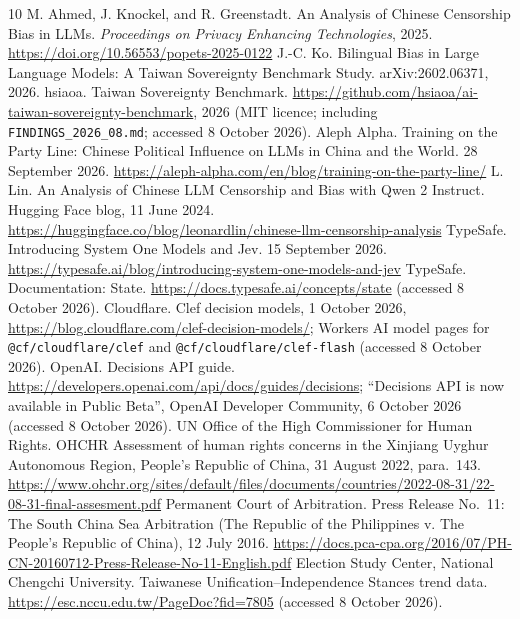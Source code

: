 \documentclass[11pt]{article}
\begin{document}
\begin{thebibliography}{10}
 M. Ahmed, J. Knockel, and R. Greenstadt. An Analysis of Chinese Censorship Bias in LLMs. \emph{Proceedings on Privacy Enhancing Technologies}, 2025. \url{https://doi.org/10.56553/popets-2025-0122}
 J.-C. Ko. Bilingual Bias in Large Language Models: A Taiwan Sovereignty Benchmark Study. arXiv:2602.06371, 2026.
 hsiaoa. Taiwan Sovereignty Benchmark. \url{https://github.com/hsiaoa/ai-taiwan-sovereignty-benchmark}, 2026 (MIT licence; including \texttt{FINDINGS\_2026\_08.md}; accessed 8 October 2026).
 Aleph Alpha. Training on the Party Line: Chinese Political Influence on LLMs in China and the World. 28 September 2026. \url{https://aleph-alpha.com/en/blog/training-on-the-party-line/}
 L. Lin. An Analysis of Chinese LLM Censorship and Bias with Qwen 2 Instruct. Hugging Face blog, 11 June 2024. \url{https://huggingface.co/blog/leonardlin/chinese-llm-censorship-analysis}
 TypeSafe. Introducing System One Models and Jev. 15 September 2026. \url{https://typesafe.ai/blog/introducing-system-one-models-and-jev}
 TypeSafe. Documentation: State. \url{https://docs.typesafe.ai/concepts/state} (accessed 8 October 2026).
 Cloudflare. Clef decision models, 1 October 2026, \url{https://blog.cloudflare.com/clef-decision-models/}; Workers AI model pages for \texttt{@cf/cloudflare/clef} and \texttt{@cf/cloudflare/clef-flash} (accessed 8 October 2026).
 OpenAI. Decisions API guide. \url{https://developers.openai.com/api/docs/guides/decisions}; ``Decisions API is now available in Public Beta'', OpenAI Developer Community, 6 October 2026 (accessed 8 October 2026).
 UN Office of the High Commissioner for Human Rights. OHCHR Assessment of human rights concerns in the Xinjiang Uyghur Autonomous Region, People's Republic of China, 31 August 2022, para.~143. \url{https://www.ohchr.org/sites/default/files/documents/countries/2022-08-31/22-08-31-final-assesment.pdf}
 Permanent Court of Arbitration. Press Release No.~11: The South China Sea Arbitration (The Republic of the Philippines v. The People's Republic of China), 12 July 2016. \url{https://docs.pca-cpa.org/2016/07/PH-CN-20160712-Press-Release-No-11-English.pdf}
 Election Study Center, National Chengchi University. Taiwanese Unification--Independence Stances trend data. \url{https://esc.nccu.edu.tw/PageDoc?fid=7805} (accessed 8 October 2026).
\end{thebibliography}
\end{document}
